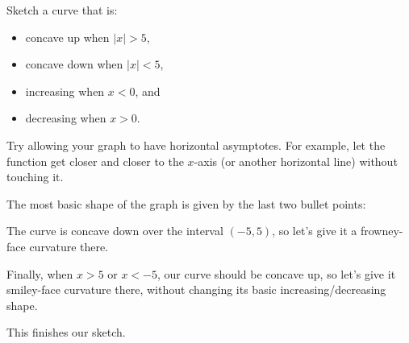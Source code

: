 \begin{Mquestion}
Sketch a curve that is:
\begin{itemize}
\item concave up when $|x|>5$,
\item concave down when $|x|<5$,
\item increasing when $x<0$, and
\item decreasing when $x>0$.
\end{itemize}
\end{Mquestion}
\begin{hint}
Try allowing your graph to have horizontal asymptotes. For example, let the function get closer and closer to the $x$-axis (or another horizontal line) without touching it.
\end{hint}
\begin{answer}
\begin{center}
\end{center}
\end{answer}
\begin{solution}
The most basic shape of the graph is given by the last two bullet points:
\begin{center}
\end{center}
The curve is concave down over the interval $(-5,5)$, so let's give it a frowney-face curvature there.
\begin{center}
\end{center}
Finally, when $x>5$ or $x<-5$, our curve should be concave up, so let's give it smiley-face curvature there, without changing its basic increasing/decreasing shape.
\begin{center}
\end{center}
This finishes our sketch.
\end{solution}


